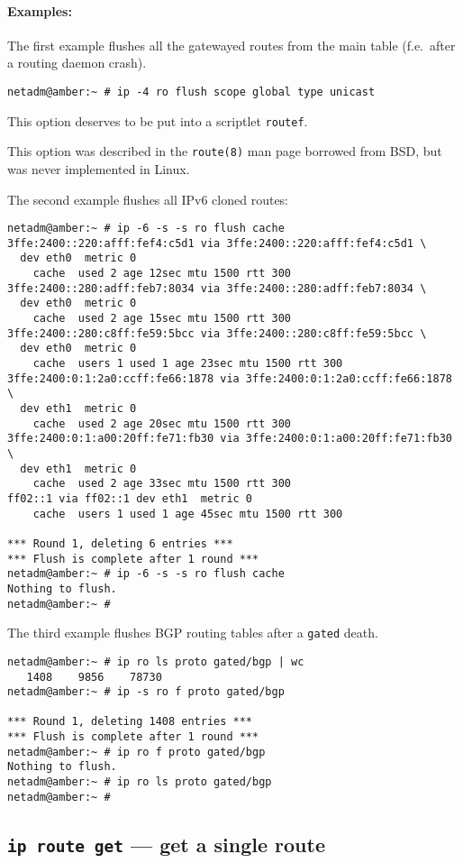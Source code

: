 \paragraph{Examples:} The first example flushes all the
gatewayed routes from the main table (f.e.\ after a routing daemon crash).
\begin{verbatim}
netadm@amber:~ # ip -4 ro flush scope global type unicast
\end{verbatim}
This option deserves to be put into a scriptlet \verb|routef|.
\begin{NB}
This option was described in the \verb|route(8)| man page borrowed
from BSD, but was never implemented in Linux.
\end{NB}

The second example flushes all IPv6 cloned routes:
\begin{verbatim}
netadm@amber:~ # ip -6 -s -s ro flush cache
3ffe:2400::220:afff:fef4:c5d1 via 3ffe:2400::220:afff:fef4:c5d1 \
  dev eth0  metric 0 
    cache  used 2 age 12sec mtu 1500 rtt 300
3ffe:2400::280:adff:feb7:8034 via 3ffe:2400::280:adff:feb7:8034 \
  dev eth0  metric 0 
    cache  used 2 age 15sec mtu 1500 rtt 300
3ffe:2400::280:c8ff:fe59:5bcc via 3ffe:2400::280:c8ff:fe59:5bcc \
  dev eth0  metric 0 
    cache  users 1 used 1 age 23sec mtu 1500 rtt 300
3ffe:2400:0:1:2a0:ccff:fe66:1878 via 3ffe:2400:0:1:2a0:ccff:fe66:1878 \
  dev eth1  metric 0 
    cache  used 2 age 20sec mtu 1500 rtt 300
3ffe:2400:0:1:a00:20ff:fe71:fb30 via 3ffe:2400:0:1:a00:20ff:fe71:fb30 \
  dev eth1  metric 0 
    cache  used 2 age 33sec mtu 1500 rtt 300
ff02::1 via ff02::1 dev eth1  metric 0 
    cache  users 1 used 1 age 45sec mtu 1500 rtt 300

*** Round 1, deleting 6 entries ***
*** Flush is complete after 1 round ***
netadm@amber:~ # ip -6 -s -s ro flush cache
Nothing to flush.
netadm@amber:~ #
\end{verbatim}

The third example flushes BGP routing tables after a \verb|gated|
death.
\begin{verbatim}
netadm@amber:~ # ip ro ls proto gated/bgp | wc
   1408    9856    78730
netadm@amber:~ # ip -s ro f proto gated/bgp

*** Round 1, deleting 1408 entries ***
*** Flush is complete after 1 round ***
netadm@amber:~ # ip ro f proto gated/bgp
Nothing to flush.
netadm@amber:~ # ip ro ls proto gated/bgp
netadm@amber:~ #
\end{verbatim}


\subsection{{\tt ip route get} --- get a single route}
\label{IP-ROUTE-GET}

